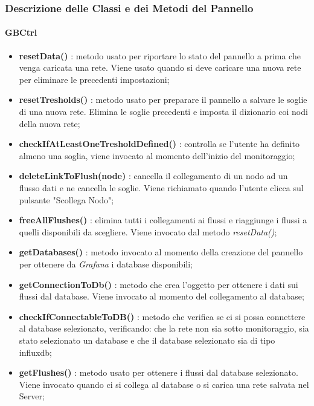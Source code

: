 \subsubsection{Descrizione delle Classi e dei Metodi del Pannello}\label{classiPannelloDescrizione}
	
	  \paragraph{GBCtrl} 
		\begin{itemize}
			\item \textbf{resetData()} : metodo usato per riportare lo stato del pannello a prima che venga caricata una rete. Viene usato quando si deve caricare una nuova rete per eliminare le precedenti impostazioni;
			\item \textbf{resetTresholds()} : metodo usato per preparare il pannello a salvare le soglie di una nuova rete. Elimina le soglie precedenti e imposta il dizionario coi nodi della nuova rete;
			\item \textbf{checkIfAtLeastOneTresholdDefined()} : controlla se l'utente ha definito almeno una soglia, viene invocato al momento dell'inizio del monitoraggio;
			\item \textbf{deleteLinkToFlush(node)} : cancella il collegamento di un nodo ad un flusso dati e ne cancella le soglie. Viene richiamato quando l'utente clicca sul pulsante "Scollega Nodo";
			\item \textbf{freeAllFlushes()} : elimina tutti i collegamenti ai flussi e riaggiunge i flussi a quelli disponibili da scegliere. Viene invocato dal metodo \textit{resetData()};
			\item \textbf{getDatabases()} : metodo invocato al momento della creazione del pannello per ottenere da \textit{Grafana} i database disponibili;
			\item \textbf{getConnectionToDb()} : metodo che crea l'oggetto per ottenere i dati sui flussi dal database. Viene invocato al momento del collegamento al database;
			\item \textbf{checkIfConnectableToDB()} : metodo che verifica se ci si possa connettere al database selezionato, verificando: che la rete non sia sotto monitoraggio, sia stato selezionato un database e che il database selezionato sia di tipo influxdb;
			\item \textbf{getFlushes()} : metodo usato per ottenere i flussi dal database selezionato. Viene invocato quando ci si collega al database  o si carica una rete salvata nel Server;

\end{itemize}
